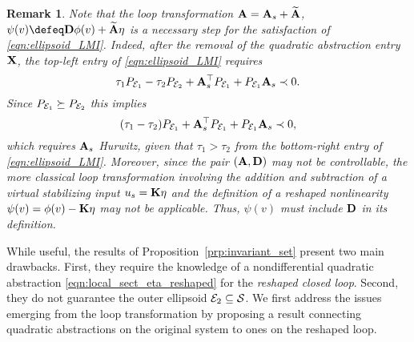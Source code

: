 \documentclass{ifacconf}
\newtheorem{remark}{Remark}
\begin{document}
\begin{remark}
    Note that the loop transformation ${\bf{A}}={\bf{A}}_s+\widetilde {{\bf{A}}}$,  $\psi(v)\defeq \bD \phi(v)+\widetilde \bA\eta$ is a necessary step for the satisfaction of \eqref{eqn:ellipsoid_LMI}. Indeed, after the removal of the quadratic abstraction entry ${\bf{X}}$, the top-left entry of \eqref{eqn:ellipsoid_LMI} requires
    \[
    \tau_1 P_{{\mathcal{E}}_1}- \tau_2 P_{{\mathcal{E}}_2} + {\bf{A}}_s^\top P_{{\mathcal{E}}_1} + P_{{\mathcal{E}}_1} {\bf{A}}_s \prec 0.
    \]
    Since $P_{{\mathcal{E}}_1}\succeq P_{{\mathcal{E}}_2}$ this implies
    \[
    (\tau_1-\tau_2) P_{{\mathcal{E}}_1} + {\bf{A}}_s^\top P_{{\mathcal{E}}_1} + P_{{\mathcal{E}}_1} {\bf{A}}_s \prec 0,
    \]
    which requires ${\bf{A}}_s$ Hurwitz, given that $\tau_1>\tau_2$ from the bottom-right entry of \eqref{eqn:ellipsoid_LMI}. Moreover, since the pair $({\bf{A}}, {\bf{D}})$ may not be controllable, the more classical loop transformation involving the addition and subtraction of a virtual stabilizing input $u_s = {\bf{K}}\eta$ and the definition of a reshaped nonlinearity $\psi(v)=\phi(v) - {\bf{K}} \eta$ may not be applicable. Thus, $\psi(v)$ must include ${\bf{D}}$ in its definition.
\end{remark}
%
While useful, the results of Proposition~\ref{prp:invariant_set} present two main drawbacks. First, they require the knowledge of a nondifferential quadratic abstraction \eqref{eqn:local_sect_eta_reshaped} for the \emph{reshaped closed loop}. Second, they do not guarantee the outer ellipsoid ${\mathcal{E}}_2\subseteq{\mathcal{S}}$. We first address the issues emerging from the loop transformation by proposing a result connecting quadratic abstractions on the original system to ones on the reshaped loop.
\end{document}
